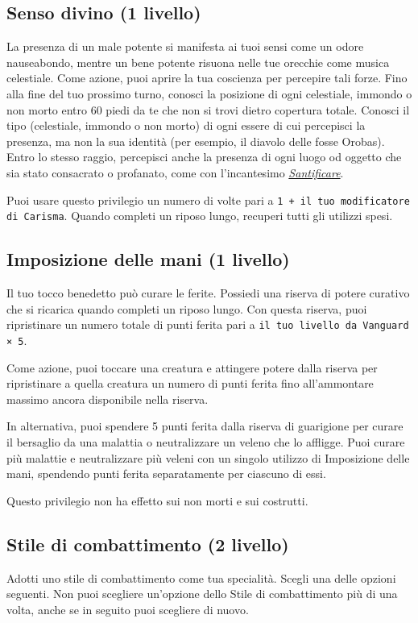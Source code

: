 \documentclass[a4paper,10pt,twoside,twocolumn,openany,bg=full,nodeprecatedcode]{dndbook}
\begin{document}
\subsection{Senso divino (1\degree{} livello)}\label{Vanguard_divine_sense}
La presenza di un male potente si manifesta ai tuoi sensi come un odore nauseabondo, mentre un bene potente risuona nelle tue orecchie come musica celestiale. Come azione, puoi aprire la tua coscienza per percepire tali forze. Fino alla fine del tuo prossimo turno, conosci la posizione di ogni celestiale, immondo o non morto entro 60 piedi da te che non si trovi dietro copertura totale. Conosci il tipo (celestiale, immondo o non morto) di ogni essere di cui percepisci la presenza, ma non la sua identità (per esempio, il diavolo delle fosse Orobas). Entro lo stesso raggio, percepisci anche la presenza di ogni luogo od oggetto che sia stato consacrato o profanato, come con l'incantesimo \emph{\hyperref[Hallow_hallow]{Santificare}}.

Puoi usare questo privilegio un numero di volte pari a \texttt{1 + il tuo modificatore di Carisma}. Quando completi un riposo lungo, recuperi tutti gli utilizzi spesi.

\subsection{Imposizione delle mani (1\degree{} livello)}\label{Vanguard_lay_on_hands}
Il tuo tocco benedetto può curare le ferite. Possiedi una riserva di potere curativo che si ricarica quando completi un riposo lungo. Con questa riserva, puoi ripristinare un numero totale di punti ferita pari a \texttt{il tuo livello da Vanguard × 5}.

Come azione, puoi toccare una creatura e attingere potere dalla riserva per ripristinare a quella creatura un numero di punti ferita fino all'ammontare massimo ancora disponibile nella riserva.

In alternativa, puoi spendere 5 punti ferita dalla riserva di guarigione per curare il bersaglio da una malattia o neutralizzare un veleno che lo affligge. Puoi curare più malattie e neutralizzare più veleni con un singolo utilizzo di Imposizione delle mani, spendendo punti ferita separatamente per ciascuno di essi.

Questo privilegio non ha effetto sui non morti e sui costrutti.

\subsection{Stile di combattimento (2\degree{} livello)}\label{Vanguard_fighting_style}
Adotti uno stile di combattimento come tua specialità. Scegli una delle opzioni seguenti. Non puoi scegliere un'opzione dello Stile di combattimento più di una volta, anche se in seguito puoi scegliere di nuovo.
\end{document}
